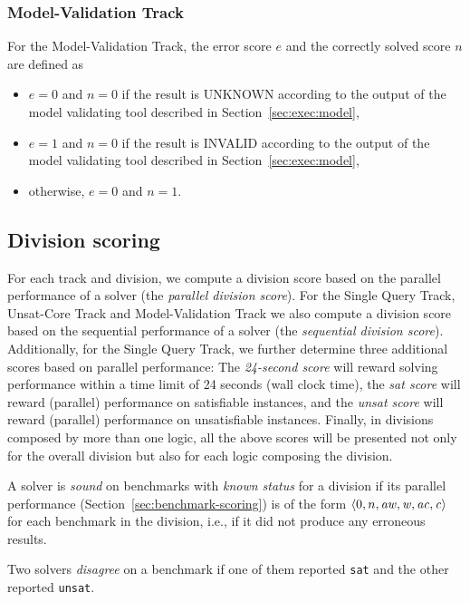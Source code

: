 \documentclass[12pt]{article}
\newcommand{\maintrack}{Single Query Track\xspace}
\newcommand{\ucoretrack}{Unsat-Core Track\xspace}
\newcommand{\mvaltrack}{Model-Validation Track\xspace}
\begin{document}
\subsubsection{\mvaltrack}
  For the \mvaltrack, the error score $e$ and the correctly solved score $n$
  are defined as
  \begin{itemize}
  \item $e=0$ and $n=0$ if the result is UNKNOWN according to the output of
    the model validating tool described in Section~\ref{sec:exec:model},
  \item $e=1$ and $n=0$ if the result is INVALID according to the output of
    the model validating tool described in Section~\ref{sec:exec:model},
  \item otherwise, $e=0$ and $n=1$.
  \end{itemize}

\subsection{Division scoring}
\label{sec:division-scoring}

For each track and division, we compute a division score based on the parallel
performance of a solver (the \emph{parallel division score}).  For the
\maintrack, \ucoretrack and \mvaltrack we also compute a division
score based on the sequential performance of a solver (the \emph{sequential
division score}).  Additionally, for the \maintrack, we further determine three
additional scores based on parallel performance: The \emph{24-second score}
will reward solving performance within a time limit of 24 seconds (wall clock
time), the \emph{sat score} will reward (parallel) performance on satisfiable
instances, and the \emph{unsat score} will reward (parallel) performance on
unsatisfiable instances.
%
Finally, in divisions composed by more than one logic, all the above scores will
be presented not only for the overall division but also for each logic composing
the division.

A solver is \emph{sound} on benchmarks with \emph{known status} for a division
if its parallel performance (Section~\ref{sec:benchmark-scoring}) is of the
form $\langle 0, n, \it{aw}, w, \it{ac}, c\rangle$ for each benchmark in the division, i.e., if
it did not produce any erroneous results.

Two solvers \emph{disagree} on a benchmark if one of them reported \texttt{sat}
and the other reported \texttt{unsat}.
\end{document}
